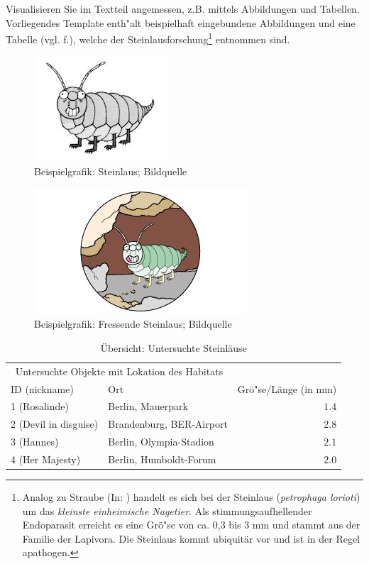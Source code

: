 Visualisieren Sie im Textteil angemessen, z.B. mittels Abbildungen und Tabellen. Vorliegendes Template enth"alt beispielhaft eingebundene Abbildungen und eine Tabelle (vgl. f.), welche der Steinlausforschung\footnote{Analog zu Straube (In: \autocite{pschy}) handelt es sich bei der Steinlaus (\textit{petrophaga lorioti}) um das \frqq \textit{kleinste einheimische Nagetier}\flqq. Als stimmungsaufhellender Endoparasit erreicht es eine Gr\"o"se von ca. 0,3 bis 3 mm und stammt aus der Familie der Lapivora. Die Steinlaus kommt ubiquit\"ar vor und ist in der Regel apathogen.} entnommen sind.


\begin{figure}
    \centering
    \includegraphics{images/steinlaus.jpg}
    \caption{Beispielgrafik: Steinlaus; Bildquelle \autocite{loriot}}
\end{figure}



\begin{figure}
    \centering
    \includegraphics{images/steinlaus2.jpg}
    \caption{Beispielgrafik: Fressende Steinlaus; Bildquelle \autocite{loriot2}}
\end{figure}

\begin{table}
    \caption{\"Ubersicht: Untersuchte Steinl\"ause}
    \centering
    \begin{tabular}{llr}
        \toprule
        \multicolumn{2}{c}{Untersuchte Objekte mit Lokation des Habitats}           \\
        \cmidrule(r){1-2}
        ID (nickname)         & Ort                      & Gr\"o"se/L\"ange (in mm) \\
        \midrule
        1 (Rosalinde)         & Berlin, Mauerpark        & $1.4$                    \\
        2 (Devil in disguise) & Brandenburg, BER-Airport & $2.8$                    \\
        3 (Hannes)            & Berlin, Olympia-Stadion  & $2.1$                    \\
        4 (Her Majesty)       & Berlin, Humboldt-Forum   & $2.0$                    \\
        \bottomrule
    \end{tabular}
\end{table}

